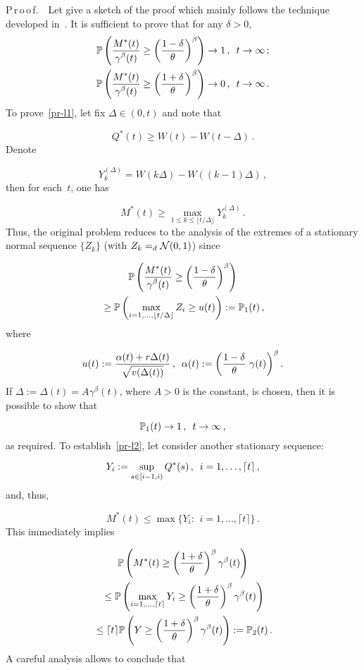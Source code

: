 \begin{multicols}{2}
\smallskip

\noindent
P\,r\,o\,o\,f.\ \  Let give a sketch of the proof which  mainly follows the
technique developed in~\cite{Zeevi}. It is sufficient to prove that
for any $\delta>0$,
\begin{align}
&\P \left( \fr{M^*(t)}{\gamma^\beta(t)} \geq \left(
\fr{1-\delta}{\theta} \right)^\beta \right ) \to 1\,,\enskip t \to
\infty \,; \label{pr-l1}\\
&\P \left( \fr{M^*(t)}{\gamma^\beta(t)} \geq \left(
\fr{1+\delta}{\theta} \right)^\beta \right) \to 0\,,\enskip t \to
\infty\,. \label{pr-l2}
\end{align}
To prove~\eqref{pr-l1}, let fix $\Delta \in (0,t)$ and note that

\noindent
$$
Q^*(t) \geq W(t)-W(t-\Delta)\,.
$$
Denote

\noindent
$$
Y_k^{(\Delta)}=W(k\Delta)-W((k-1)\Delta)\,,
$$
then for each~$t$, one has

\noindent
$$
M^*(t)\geq \max\limits_{1\leq k \leq \lfloor t/\Delta
\rfloor}Y_k^{(\Delta)}\,.
$$
Thus, the original  problem reduces to the analysis of the extremes
of a stationary normal sequence $\{Z_k\}$ (with $Z_k =_d \Nor(0,1)$) since

\noindent
\begin{multline*}
\P \left( \fr{M^*(t)}{\gamma^\beta(t)}\geq \left(
\fr{1-\delta}{\theta}\right)^\beta \right) \\
{}\geq \P \left(
\max\limits_{i=1,\ldots ,\lfloor t/\Delta \rfloor}Z_i \geq u(t)\right) := \P_1(t)\,,
\end{multline*}
where

\noindent
$$
u(t):= \fr{ \alpha(t)+r\Delta(t)}{\sqrt{v(\Delta(t))}}\,,\enskip
\alpha(t):=\left( \fr{1-\delta}{\theta}\,\,\gamma (t) \right)^\beta.
$$
If $\Delta:=\Delta(t)=A\gamma^\beta(t)$, where  $A>0$ is the
constant, is chosen, then it is possible to show that

\noindent
$$
\P_1(t) \to 1\,,\enskip  t \to \infty\,,
$$
as required. To establish~\eqref{pr-l2}, let  consider another stationary sequence:

\noindent
$$
Y_i:=\sup\limits_{s \in [i-1,i)} Q^*(s)\,,\enskip
i=1,\ldots ,\lceil t \rceil\,,
$$
and, thus,

\noindent
$$
M^*(t) \leq \max\{Y_i:\ \, i=1,\ldots ,\lceil t \rceil\}\,.
$$
This  immediately implies

\noindent
\begin{multline*}
\P \left( M^*(t) \geq \left(\fr{1+\delta}{\theta}\right)^\beta
\gamma^\beta(t) \right)\\
{} \leq \P \left( \max\limits_{i=1,\ldots ,\lceil t
\rceil} Y_i \geq \left(\fr{1+\delta}{\theta}\right)^\beta
\gamma^\beta(t)  \right)\\
{}\leq \lceil t \rceil \P \left(Y \geq
\left(\fr{1+\delta}{\theta}\right)^\beta \gamma^\beta(t)
\right) :=\P_2(t)\,.
\end{multline*}
A careful analysis allows to conclude   that


\end{multicols}
